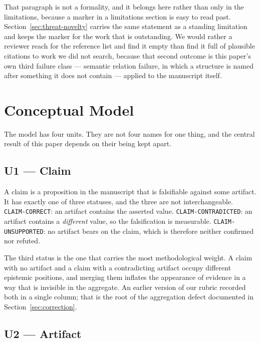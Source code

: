 \documentclass[sigconf,review]{acmart}
\begin{document}
That paragraph is not a formality, and it belongs here rather than only in the
limitations, because a marker in a limitations section is easy to read past.
Section~\ref{sec:threat-novelty} carries the same statement as a standing
limitation and keeps the marker for the work that is outstanding. We would
rather a reviewer reach for the reference list and find it empty than find it
full of plausible citations to work we did not search, because that second
outcome is this paper's own third failure class --- semantic relation
failure, in which a structure is named after something it does not contain ---
applied to the manuscript itself.

\section{Conceptual Model}
\label{sec:model}

The model has four units. They are not four names for one thing, and the
central result of this paper depends on their being kept apart.

\subsection{U1 --- Claim}
\label{sec:model-claim}

A claim is a proposition in the manuscript that is falsifiable against some
artifact. It has exactly one of three statuses, and the three are not
interchangeable. \texttt{CLAIM-CORRECT}: an artifact contains the asserted
value. \texttt{CLAIM-CONTRADICTED}: an artifact contains a
\emph{different} value, so the falsification is measurable.
\texttt{CLAIM-UNSUPPORTED}: no artifact bears on the claim, which is therefore
neither confirmed nor refuted.

The third status is the one that carries the most methodological weight. A
claim with no artifact and a claim with a contradicting artifact occupy
different epistemic positions, and merging them inflates the appearance of
evidence in a way that is invisible in the aggregate. An earlier version of
our rubric recorded both in a single column; that is the root of the
aggregation defect documented in Section~\ref{sec:correction}.

\subsection{U2 --- Artifact}
\label{sec:model-artifact}
\end{document}
